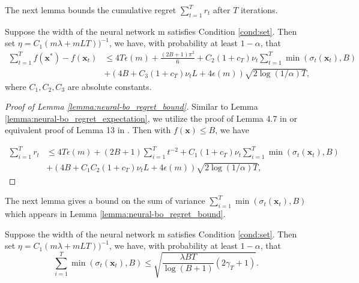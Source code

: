 The next lemma bounds the cumulative regret $\sum_{t=1}^T r_t$ after $T$ iterations. 
\begin{lemma}
\label{lemma:neural-bo_regret_bound}
Suppose the width of the neural network m satisfies Condition \ref{cond:set}. Then set $\eta = C_1(m\lambda + mLT))^{-1}$, we have, with probability at least $1-\alpha$, that
\begin{equation*}
\begin{split}
   \sum_{t=1}^T f(\mathbf{x^*}) - f(\mathbf{x}_t)
    & \leq  4T \epsilon(m) + \frac{(2B+1)\pi^2}{6} + C_2(1+c_T)\nu_t \sum^T_{t=1} \min(\sigma_t(\mathbf{x}_t),B) \\ &
    + (4B+ C_3 (1+c_T)\nu_t L + 4\epsilon(m)) \sqrt{2 \log(1/\alpha)T},
\end{split}
\end{equation*}
where $C_1, C_2, C_3$ are absolute constants.
\end{lemma}
\begin{proof}[Proof of Lemma \ref{lemma:neural-bo_regret_bound}]
    

Similar to Lemma \ref{lemma:neural-bo_regret_expectation}, we utilize the proof of Lemma 4.7 in \citet{zhang2021neural} or equivalent proof of Lemma 13 in \citet{chowdhury2017kernelized}. Then with $f(\mathbf{x})\leq B$, we have

\begin{equation*}
\begin{split}
    \sum_{i=1}^T r_t & \leq 4T\epsilon(m) + (2B+1) \sum_{i=1}^T t^{-2} + C_1 (1+c_T)\nu_t\sum_{i=1}^T \min(\sigma_t(\mathbf{x}_t),B) \\ & + (4B + C_1C_2(1 + c_T )\nu_t L + 4\epsilon(m))\sqrt{2 \log(1/\alpha)T},
\end{split} 
\end{equation*}
\end{proof}
The next lemma gives a bound on the sum of variance $\sum_{i=1}^T \min(\sigma_t(\mathbf{x}_t), B)$ which appears in Lemma \ref{lemma:neural-bo_regret_bound}.
\begin{lemma}
\label{lemma:neural-bo_min_sigma}
Suppose the width of the neural network m satisfies Condition \ref{cond:set}. Then set $\eta = C_1(m\lambda + mLT))^{-1}$, we have, with probability at least $1-\alpha$, that
\begin{equation*}
    \sum_{i=1}^T \min(\sigma_t(\mathbf{x}_t),B) \leq \sqrt{\frac{\lambda BT}{\log(B+1)} (2\gamma_T+1) }. 
\end{equation*}
\end{lemma}
